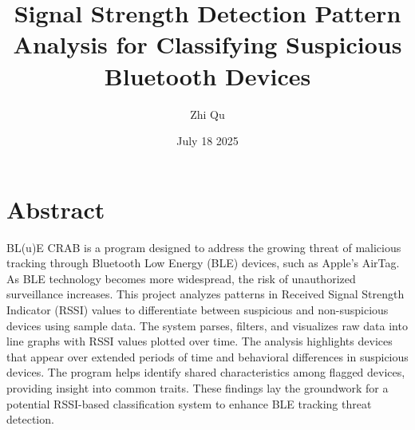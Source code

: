 \documentclass{article}
\title{Signal Strength Detection Pattern Analysis for Classifying Suspicious Bluetooth Devices}
\author{Zhi Qu}
\date{July 18 2025}
\begin{document}
\maketitle
\section{Abstract}
BL(u)E CRAB is a program designed to address the growing threat of malicious tracking through Bluetooth Low Energy (BLE) devices, such as Apple’s AirTag. As BLE technology becomes more widespread, the risk of unauthorized surveillance increases. This project analyzes patterns in Received Signal Strength Indicator (RSSI) values to differentiate between suspicious and non-suspicious devices using sample data. The system parses, filters, and visualizes raw data into line graphs with RSSI values plotted over time. The analysis highlights devices that appear over extended periods of time and behavioral differences in suspicious devices. The program helps identify shared characteristics among flagged devices, providing insight into common traits. These findings lay the groundwork for a potential RSSI-based classification system to enhance BLE tracking threat detection.

    
    
\end{document}
